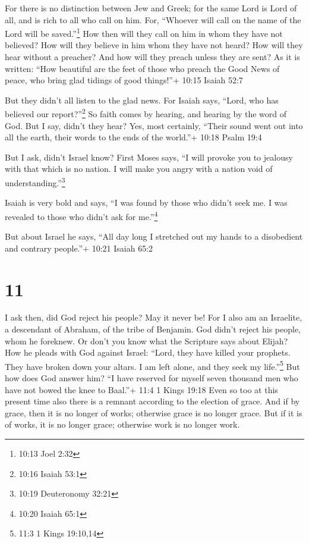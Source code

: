  For there is no distinction between Jew and Greek; for the
same Lord is Lord of all, and is rich to all who call on him.
 For, ``Whoever will call on the name of the Lord will be
saved.''\footnote{10:13 Joel 2:32}  How then will they call
on him in whom they have not believed? How will they believe in him whom
they have not heard? How will they hear without a preacher?
 And how will they preach unless they are sent? As it is
written: ``How beautiful are the feet of those who preach the Good News
of peace, who bring glad tidings of good things!''+ 10:15 Isaiah 52:7

 But they didn't all listen to the glad news. For Isaiah
says, ``Lord, who has believed our report?''\footnote{10:16 Isaiah 53:1}
 So faith comes by hearing, and hearing by the word of God.
 But I say, didn't they hear? Yes, most certainly, ``Their
sound went out into all the earth, their words to the ends of the
world.''+ 10:18 Psalm 19:4

 But I ask, didn't Israel know? First Moses says, ``I will
provoke you to jealousy with that which is no nation. I will make you
angry with a nation void of understanding.''\footnote{10:19 Deuteronomy
  32:21}

 Isaiah is very bold and says, ``I was found by those who
didn't seek me. I was revealed to those who didn't ask for
me.''\footnote{10:20 Isaiah 65:1}

 But about Israel he says, ``All day long I stretched out
my hands to a disobedient and contrary people.''+ 10:21 Isaiah 65:2

\hypertarget{section-10}{%
\section{11}\label{section-10}}

 I ask then, did God reject his people? May it never be! For
I also am an Israelite, a descendant of Abraham, of the tribe of
Benjamin.  God didn't reject his people, whom he foreknew.
Or don't you know what the Scripture says about Elijah? How he pleads
with God against Israel:  ``Lord, they have killed your
prophets. They have broken down your altars. I am left alone, and they
seek my life.''\footnote{11:3 1 Kings 19:10,14}  But how
does God answer him? ``I have reserved for myself seven thousand men who
have not bowed the knee to Baal.''+ 11:4 1 Kings 19:18  Even
so too at this present time also there is a remnant according to the
election of grace.  And if by grace, then it is no longer of
works; otherwise grace is no longer grace. But if it is of works, it is
no longer grace; otherwise work is no longer work.


